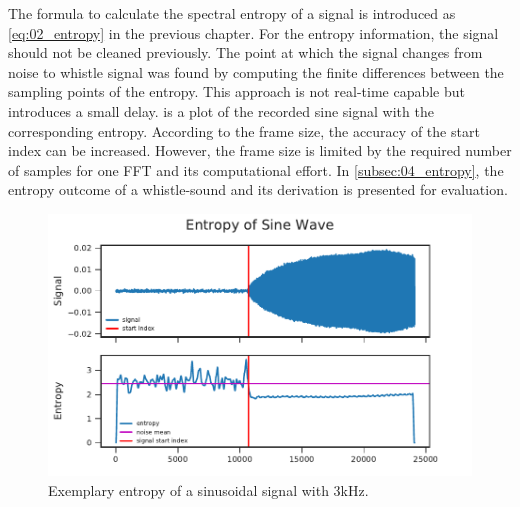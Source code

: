 The formula to calculate the spectral entropy of a signal is introduced as
\cref{eq:02_entropy} in the previous chapter.
For the entropy information, the signal should not be cleaned previously.
The point at which the signal changes from noise to whistle signal was found by
computing the finite differences between the sampling points of the entropy.
This approach is not real-time capable but introduces a small delay.
 is a plot of the recorded sine signal with the corresponding
entropy.
According to the frame size, the accuracy of the start index can be increased.
However, the frame size is limited by the required number of samples for one \ac{FFT} and
its computational effort.
In \cref{subsec:04_entropy}, the entropy outcome of a whistle-sound
and its derivation is presented for evaluation.
\begin{figure}[ht]
	\centering
		\includegraphics[]{figures/sine_entropy}
	\caption{Exemplary entropy of a sinusoidal signal with 3\si{\kilo\hertz}.}
	\label{fig:03_entropy}
\end{figure}


